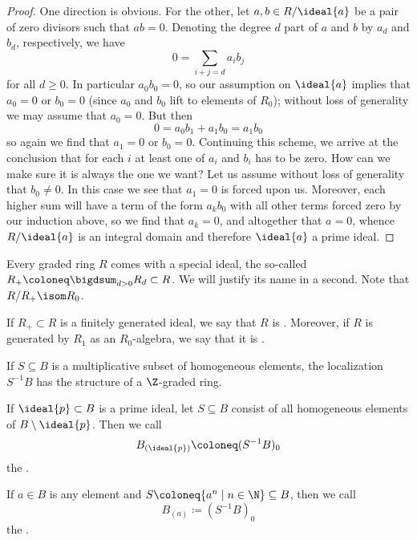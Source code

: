 \documentclass[wip, algebra]{bsteffan-lecturenotes}
\begin{document}
\begin{proof}
	One direction is obvious.
	For the other, let $a, b \in R / \ideal{a}$ be a pair of zero divisors such that $ab = 0$.
	Denoting the degree $d$ part of $a$ and $b$ by $a_d$ and $b_d$, respectively, we have 
	\begin{equation*}
		0 = \sum_{i + j = d} a_i b_j
	\end{equation*}
	for all $d \geq 0$.
	In particular $a_0 b_0 = 0$, so our assumption on $\ideal{a}$ implies that $a_0 = 0$ or $b_0 = 0$ (since $a_0$ and $b_0$ lift to elements of $R_0$); without loss of generality we may assume that $a_0 = 0$.
	But then
	\begin{equation*}
		0 = a_0 b_1 + a_1 b_0 = a_1 b_0
	\end{equation*}
	so again we find that $a_1 = 0$ or $b_0 = 0$.
	Continuing this scheme, we arrive at the conclusion that for each $i$ at least one of $a_i$ and $b_i$ has to be zero.
	How can we make sure it is always the one we want? Let us assume without loss of generality that $b_0 \neq 0$.
	In this case we see that $a_1 = 0$ is forced upon us.
	Moreover, each higher sum will have a term of the form $a_k b_0$ with all other terms forced zero by our induction above, so we find that $a_k = 0$, and altogether that $a = 0$, whence $R / \ideal{a}$ is an integral domain and therefore $\ideal{a}$ a prime ideal.
\end{proof}
Every graded ring $R$ comes with a special ideal, the so-called  $R_+ \coloneq \bigdsum_{d > 0} R_d \subset R$.
We will justify its name in a second.
Note that $R / R_+ \isom R_0$.
\begin{definition}
	If $R_+ \subset R$ is a finitely generated ideal, we say that $R$ is .
	Moreover, if $R$ is generated by $R_1$ as an $R_0$-algebra, we say that it is .
\end{definition}
If $S \subseteq B$ is a multiplicative subset of homogeneous elements, the localization $S^{-1} B$ has the structure of a $\Z$-graded ring.
\begin{definition}
	\leavevmode
	\begin{alphanumerate}
		\item If $\ideal{p} \subset B$ is a prime ideal, let $S \subseteq B$ consist of all homogeneous elements of $B \setminus \ideal{p}$.
			Then we call
			\begin{equation*}
				B_{(\ideal{p})} \coloneq (S^{-1} B)_0
			\end{equation*}
			the .
		\item If $a \in B$ is any element and $S \coloneq \{a^n \mid n \in \N\} \subseteq B$, then we call
			\begin{equation*}
				B_{(a)} \coloneq (S^{-1} B)_0
			\end{equation*}
			the .
	\end{alphanumerate}
\end{definition}
\end{document}
